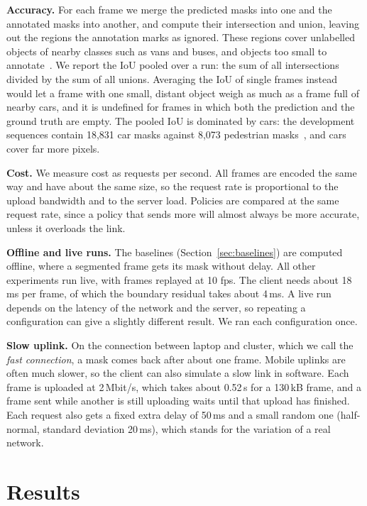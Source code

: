 \documentclass[conference]{IEEEtran}
\begin{document}
\textbf{Accuracy.} For each frame we merge the predicted masks into one and the annotated masks into another, and compute their intersection and union, leaving out the regions the annotation marks as ignored. These regions cover unlabelled objects of nearby classes such as vans and buses, and objects too small to annotate~\cite{voigtlaender2019mots}. We report the IoU pooled over a run: the sum of all intersections divided by the sum of all unions. Averaging the IoU of single frames instead would let a frame with one small, distant object weigh as much as a frame full of nearby cars, and it is undefined for frames in which both the prediction and the ground truth are empty. The pooled IoU is dominated by cars: the development sequences contain 18{,}831 car masks against 8{,}073 pedestrian masks~\cite{voigtlaender2019mots}, and cars cover far more pixels.

\textbf{Cost.} We measure cost as requests per second. All frames are encoded the same way and have about the same size, so the request rate is proportional to the upload bandwidth and to the server load. Policies are compared at the same request rate, since a policy that sends more will almost always be more accurate, unless it overloads the link.

\textbf{Offline and live runs.} The baselines (Section~\ref{sec:baselines}) are computed offline, where a segmented frame gets its mask without delay. All other experiments run live, with frames replayed at 10 fps. The client needs about 18\,ms per frame, of which the boundary residual takes about 4\,ms. A live run depends on the latency of the network and the server, so repeating a configuration can give a slightly different result. We ran each configuration once.

\textbf{Slow uplink.} On the connection between laptop and cluster, which we call the \emph{fast connection}, a mask comes back after about one frame. Mobile uplinks are often much slower, so the client can also simulate a slow link in software. Each frame is uploaded at 2\,Mbit/s, which takes about 0.52\,s for a 130\,kB frame, and a frame sent while another is still uploading waits until that upload has finished. Each request also gets a fixed extra delay of 50\,ms and a small random one (half-normal, standard deviation 20\,ms), which stands for the variation of a real network.

\section{Results}
\end{document}
